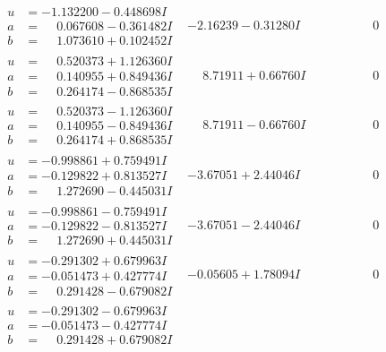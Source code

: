 \documentclass[1p]{elsarticle_modified}
\theoremstyle{definition}
\begin{document}
$$\begin{array}{c|c|c}
\begin{aligned}
u &= -1.132200 - 0.448698 I \\
a &= \phantom{-}0.067608 - 0.361482 I \\
b &= \phantom{-}1.073610 + 0.102452 I\end{aligned}
 & -2.16239 - 0.31280 I & \phantom{-0.000000 } 0 \\ \hline\begin{aligned}
u &= \phantom{-}0.520373 + 1.126360 I \\
a &= \phantom{-}0.140955 + 0.849436 I \\
b &= \phantom{-}0.264174 - 0.868535 I\end{aligned}
 & \phantom{-}8.71911 + 0.66760 I & \phantom{-0.000000 } 0 \\ \hline\begin{aligned}
u &= \phantom{-}0.520373 - 1.126360 I \\
a &= \phantom{-}0.140955 - 0.849436 I \\
b &= \phantom{-}0.264174 + 0.868535 I\end{aligned}
 & \phantom{-}8.71911 - 0.66760 I & \phantom{-0.000000 } 0 \\ \hline\begin{aligned}
u &= -0.998861 + 0.759491 I \\
a &= -0.129822 + 0.813527 I \\
b &= \phantom{-}1.272690 - 0.445031 I\end{aligned}
 & -3.67051 + 2.44046 I & \phantom{-0.000000 } 0 \\ \hline\begin{aligned}
u &= -0.998861 - 0.759491 I \\
a &= -0.129822 - 0.813527 I \\
b &= \phantom{-}1.272690 + 0.445031 I\end{aligned}
 & -3.67051 - 2.44046 I & \phantom{-0.000000 } 0 \\ \hline\begin{aligned}
u &= -0.291302 + 0.679963 I \\
a &= -0.051473 + 0.427774 I \\
b &= \phantom{-}0.291428 - 0.679082 I\end{aligned}
 & -0.05605 + 1.78094 I & \phantom{-0.000000 } 0 \\ \hline\begin{aligned}
u &= -0.291302 - 0.679963 I \\
a &= -0.051473 - 0.427774 I \\
b &= \phantom{-}0.291428 + 0.679082 I\end{aligned}

\end{array}$$
\end{document}
